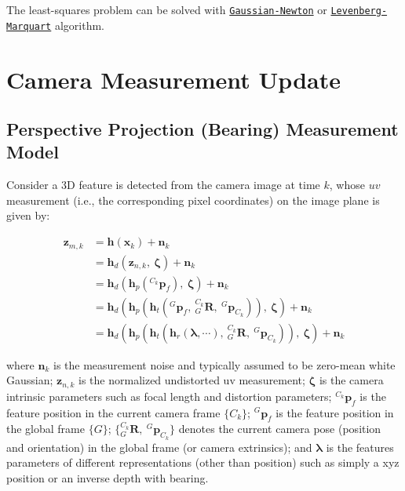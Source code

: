 The least-\/squares problem can be solved with \href{https://en.wikipedia.org/wiki/Gauss%E2%80%93Newton_algorithm}{\tt Gaussian-\/\+Newton} or \href{https://en.wikipedia.org/wiki/Levenberg%E2%80%93Marquardt_algorithm}{\tt Levenberg-\/\+Marquart} algorithm. \hypertarget{update-feat}{}\section{Camera Measurement Update}\label{update-feat}
\hypertarget{update-feat_model}{}\subsection{Perspective Projection (\+Bearing) Measurement Model}\label{update-feat_model}
Consider a 3D feature is detected from the camera image at time $k$, whose $uv$ measurement (i.\+e., the corresponding pixel coordinates) on the image plane is given by\+:

\begin{align*} \mathbf{z}_{m,k} &= \mathbf h(\mathbf x_k) + \mathbf n_k \\ &= \mathbf h_d(\mathbf{z}_{n,k}, ~\boldsymbol\zeta) + \mathbf{n}_k \\ &= \mathbf h_d(\mathbf h_p({}^{C_k}\mathbf{p}_f), ~\boldsymbol\zeta) + \mathbf{n}_k \\ &= \mathbf h_d(\mathbf h_p(\mathbf h_t({}^{G}\mathbf{p}_f,~{}^{C_k}_{G}\mathbf{R},~{}^{G}\mathbf{p}_{C_k})), ~\boldsymbol\zeta) + \mathbf{n}_k \\ &= \mathbf h_d(\mathbf h_p(\mathbf h_t(\mathbf h_r(\boldsymbol\lambda,\cdots),~{}^{C_k}_{G}\mathbf{R},~{}^{G}\mathbf{p}_{C_k})), ~\boldsymbol\zeta) + \mathbf{n}_k \end{align*}

where $\mathbf n_k$ is the measurement noise and typically assumed to be zero-\/mean white Gaussian; $\mathbf z_{n,k}$ is the normalized undistorted uv measurement; $\boldsymbol\zeta$ is the camera intrinsic parameters such as focal length and distortion parameters; ${}^{C_k}\mathbf{p}_f$ is the feature position in the current camera frame $\{C_k\}$; ${}^{G}\mathbf{p}_f$ is the feature position in the global frame $\{G\}$; $\{ {}^{C_k}_{G}\mathbf{R},~{}^{G}\mathbf{p}_{C_k} \}$ denotes the current camera pose (position and orientation) in the global frame (or camera extrinsics); and $\boldsymbol\lambda$ is the feature\textquotesingle{}s parameters of different representations (other than position) such as simply a xyz position or an inverse depth with bearing.

